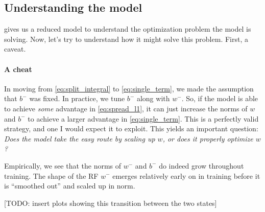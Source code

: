 \documentclass{article}
\begin{document}
\subsection*{Understanding the model}
 gives us a reduced model to understand the optimization problem the model is solving.
Now, let's try to understand how it might solve this problem.
First, a caveat.

\paragraph*{A cheat}
In moving from \cref{eq:split_integral} to \cref{eq:single_term}, we made the assumption that $b^-$ was fixed.
In practice, we tune $b^-$ along with $w^-$.
So, if the model is able to achieve \emph{some} advantage in \cref{eq:spread_l1}, it can just increase the norms of $w$ and $b^-$ to achieve a larger advantage in \cref{eq:single_term}.
This is a perfectly valid strategy, and one I would expect it to exploit.
This yields an important question: \emph{Does the model take the easy route by scaling up $w$, or does it properly optimize $w$?}

Empirically, we see that the norms of $w^-$ and $b^-$ do indeed grow throughout training.
The shape of the RF $w^-$ emerges relatively early on in training before it is ``smoothed out'' and scaled up in norm.

[TODO: insert plots showing this transition between the two states]

\end{document}
